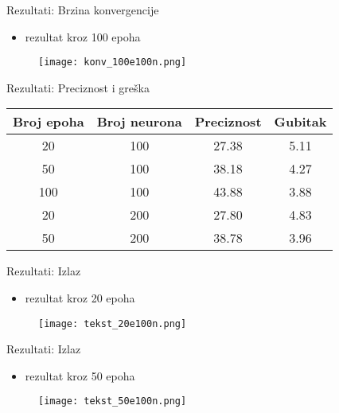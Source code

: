 \documentclass[table]{beamer}
\begin{document}
\begin{frame}{Rezultati: Brzina konvergencije}
\begin{itemize}
    \item rezultat kroz 100 epoha
\end{itemize}
\begin{figure}
    \centering
    \texttt{[image: konv\_100e100n.png]}
\end{figure}
    
\end{frame}


\begin{frame}{Rezultati: Preciznost i greška}
\begin{table}[]
 
    \begin{tabular}{|| c c c c ||}
    \hline
    \rowcolor{lightgray!50}Broj epoha & Broj neurona & Preciznost & Gubitak \\
    \hline\hline
    \rowcolor{orange!50} 20 & 100 & 27.38 & 5.11 \\
    \rowcolor{orange!70} 50 & 100 & 38.18  & 4.27 \\
    \rowcolor{orange}100 & 100 & 43.88 & 3.88 \\
    \rowcolor{orange!50}20 & 200 & 27.80 & 4.83 \\
    \rowcolor{orange!70} 50 & 200 & 38.78 & 3.96 \\
     \hline
    \end{tabular}
    
\end{table}
\end{frame}

\begin{frame}{Rezultati: Izlaz}
\begin{itemize}
    \item rezultat kroz 20 epoha
\end{itemize}
\begin{figure}
    \centering
    \texttt{[image: tekst\_20e100n.png]}
\end{figure}

\end{frame}


\begin{frame}{Rezultati: Izlaz}
\begin{itemize}
    \item rezultat kroz 50 epoha
\end{itemize}
\begin{figure}
    \centering
    \texttt{[image: tekst\_50e100n.png]}
\end{figure}

\end{frame}
\end{document}
